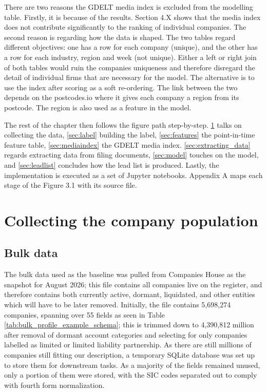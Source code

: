 \documentclass[ %
                    author={Natchalin Iwsakul \\ Inkaphol Siriwongwattana \\ Tanaphan Kummaraphat \\ Patorn Srisupap},
                supervisor={Fernando Moreno-Pino},
                    degree={MSc},
                     title={Propensity Modelling for SME Commercial Lending Using Open Public Data},
                  subtitle={Companies House filings and GDELT media coverage as predictors of first-time borrowing},
                      type={},
                      year={2026}]{dissertation}
\begin{document}
There are two reasons the GDELT media index is excluded from the modelling table. Firstly, it is because of the results. Section 4.X shows that the media index does not contribute significantly to the ranking of individual companies. The second reason is regarding how the data is shaped. The two tables regard different objectives: one has a row for each company (unique), and the other has a row for each industry, region and week (not unique). Either a left or right join of both tables would ruin the companies uniqueness and therefore disregard the detail of individual firms that are necessary for the model. The alternative is to use the index after scoring as a soft re-ordering. The link between the two depends on the postcodes.io where it gives each company a region from its postcode. The region is also used as a feature in the model.

The rest of the chapter then follows the figure path step-by-step. \ref{sec:collection} talks on collecting the data, \ref{sec:label} building the label, \ref{sec:features} the point-in-time feature table, \ref{sec:mediaindex} the GDELT media index. \ref{sec:extracting_data} regards extracting data from filing documents, \ref{sec:model} touches on the model, and \ref{sec:leadlist} concludes how the lead list is produced. Lastly, the implementation is executed as a set of Jupyter notebooks. Appendix A maps each stage of the Figure 3.1 with its source file.


\section{Collecting the company population}    
\label{sec:collection}
  \subsection{Bulk data}
  \label{chap:CH_bulk_data}
    The bulk data used as the baseline was pulled from Companies House \cite{CH_bulk_profiles} as the snapshot for August 2026; this file contains all companies live on the register, and therefore contains both currently active,  dormant, liquidated, and other entities which will have to be later removed. Initially, the file contains 5,698,274 companies, spanning over 55 fields as seen in Table \ref{tab:bulk_profile_example_schema}; this is trimmed down to 4,390,812 million after removal of dormant account categories and selecting for only companies labelled as limited or limited liability partnership. As there are still millions of companies still fitting our description, a temporary SQLite database was set up to store them for downstream tasks. As a majority of the fields remained unused, only a portion of them were stored, with the SIC codes separated out to comply with fourth form normalization.
    
\end{document}
